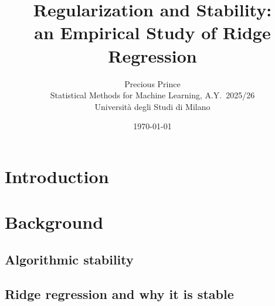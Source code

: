 \documentclass[11pt,a4paper]{article}
\title{Regularization and Stability:\\an Empirical Study of Ridge Regression}
\author{Precious Prince\\Statistical Methods for Machine Learning, A.Y.\ 2025/26\\Universit\`a degli Studi di Milano}
\date{\today}
\begin{document}
\maketitle

\begin{abstract}
\end{abstract}

\section{Introduction}

\section{Background}
\subsection{Algorithmic stability}

\subsection{Ridge regression and why it is stable}

\end{document}
